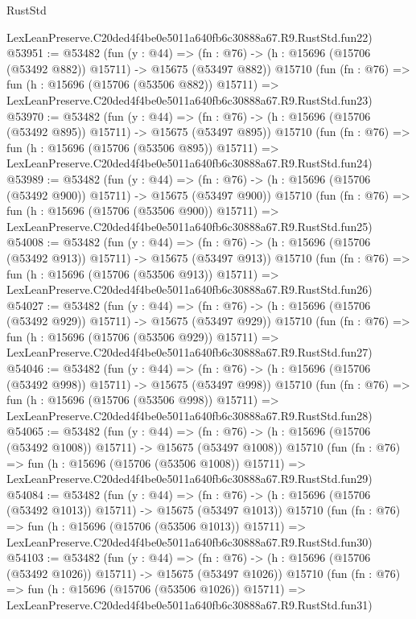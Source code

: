 \begin{lexlean}{RustStd}
\begin{coremodule}
    LexLeanPreserve.C20ded4f4be0e5011a640fb6c30888a67.R9.RustStd.fun22)
@53951 := @53482
    (fun (y : @44) =>
    (fn : @76) -> (h : @15696 (@15706 (@53492 @882)) @15711) -> @15675 (@53497 @882))
    @15710
    (fun (fn : @76) =>
    fun (h : @15696 (@15706 (@53506 @882)) @15711) =>
    LexLeanPreserve.C20ded4f4be0e5011a640fb6c30888a67.R9.RustStd.fun23)
@53970 := @53482
    (fun (y : @44) =>
    (fn : @76) -> (h : @15696 (@15706 (@53492 @895)) @15711) -> @15675 (@53497 @895))
    @15710
    (fun (fn : @76) =>
    fun (h : @15696 (@15706 (@53506 @895)) @15711) =>
    LexLeanPreserve.C20ded4f4be0e5011a640fb6c30888a67.R9.RustStd.fun24)
@53989 := @53482
    (fun (y : @44) =>
    (fn : @76) -> (h : @15696 (@15706 (@53492 @900)) @15711) -> @15675 (@53497 @900))
    @15710
    (fun (fn : @76) =>
    fun (h : @15696 (@15706 (@53506 @900)) @15711) =>
    LexLeanPreserve.C20ded4f4be0e5011a640fb6c30888a67.R9.RustStd.fun25)
@54008 := @53482
    (fun (y : @44) =>
    (fn : @76) -> (h : @15696 (@15706 (@53492 @913)) @15711) -> @15675 (@53497 @913))
    @15710
    (fun (fn : @76) =>
    fun (h : @15696 (@15706 (@53506 @913)) @15711) =>
    LexLeanPreserve.C20ded4f4be0e5011a640fb6c30888a67.R9.RustStd.fun26)
@54027 := @53482
    (fun (y : @44) =>
    (fn : @76) -> (h : @15696 (@15706 (@53492 @929)) @15711) -> @15675 (@53497 @929))
    @15710
    (fun (fn : @76) =>
    fun (h : @15696 (@15706 (@53506 @929)) @15711) =>
    LexLeanPreserve.C20ded4f4be0e5011a640fb6c30888a67.R9.RustStd.fun27)
@54046 := @53482
    (fun (y : @44) =>
    (fn : @76) -> (h : @15696 (@15706 (@53492 @998)) @15711) -> @15675 (@53497 @998))
    @15710
    (fun (fn : @76) =>
    fun (h : @15696 (@15706 (@53506 @998)) @15711) =>
    LexLeanPreserve.C20ded4f4be0e5011a640fb6c30888a67.R9.RustStd.fun28)
@54065 := @53482
    (fun (y : @44) =>
    (fn : @76) -> (h : @15696 (@15706 (@53492 @1008)) @15711) -> @15675 (@53497 @1008))
    @15710
    (fun (fn : @76) =>
    fun (h : @15696 (@15706 (@53506 @1008)) @15711) =>
    LexLeanPreserve.C20ded4f4be0e5011a640fb6c30888a67.R9.RustStd.fun29)
@54084 := @53482
    (fun (y : @44) =>
    (fn : @76) -> (h : @15696 (@15706 (@53492 @1013)) @15711) -> @15675 (@53497 @1013))
    @15710
    (fun (fn : @76) =>
    fun (h : @15696 (@15706 (@53506 @1013)) @15711) =>
    LexLeanPreserve.C20ded4f4be0e5011a640fb6c30888a67.R9.RustStd.fun30)
@54103 := @53482
    (fun (y : @44) =>
    (fn : @76) -> (h : @15696 (@15706 (@53492 @1026)) @15711) -> @15675 (@53497 @1026))
    @15710
    (fun (fn : @76) =>
    fun (h : @15696 (@15706 (@53506 @1026)) @15711) =>
    LexLeanPreserve.C20ded4f4be0e5011a640fb6c30888a67.R9.RustStd.fun31)

\end{coremodule}
\end{lexlean}
